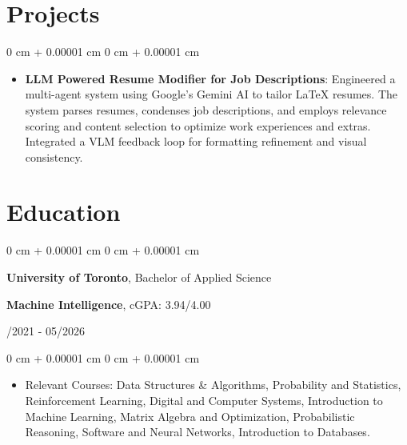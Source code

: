 \documentclass[10pt, letterpaper]{article}
\newenvironment{highlights}{
    \begin{itemize}[
        topsep=0.10 cm,
        parsep=0.10 cm,
        partopsep=0pt,
        itemsep=0pt,
        leftmargin=0 cm + 10pt
    ]
}{
    \end{itemize}
}
\newenvironment{onecolentry}{
    \begin{adjustwidth}{
        0 cm + 0.00001 cm
    }{
        0 cm + 0.00001 cm
    }
}{
    \end{adjustwidth}
}
\newenvironment{twocolentry}[2][]{
    \onecolentry
    \def\secondColumn{#2}
    \setcolumnwidth{\fill, 4.5 cm}
    \begin{paracol}{2}
}{
    \switchcolumn \raggedleft \secondColumn
    \end{paracol}
    \endonecolentry
}
\begin{document}
\section{Projects}
\vspace{0.10 cm}
\begin{onecolentry}
    \begin{highlights}
        \item \textbf{LLM Powered Resume Modifier for Job Descriptions}: Engineered a multi-agent system using Google's Gemini AI to tailor LaTeX resumes. The system parses resumes, condenses job descriptions, and employs relevance scoring and content selection to optimize work experiences and extras. Integrated a VLM feedback loop for formatting refinement and visual consistency.
    \end{highlights}
\end{onecolentry}

\section{Education}
\vspace{0.08 cm}
\begin{twocolentry}{09/2021 - 05/2026}
    {\textbf{University of Toronto}}, Bachelor of Applied Science  
    \item \textbf{Machine Intelligence}, cGPA: {3.94}/4.00
\end{twocolentry}
\vspace{0.10 cm}
\begin{onecolentry}
    \begin{highlights}
        \item Relevant Courses: Data Structures \& Algorithms, Probability and Statistics, Reinforcement Learning, Digital and Computer Systems, Introduction to Machine Learning, Matrix Algebra and Optimization, Probabilistic Reasoning, Software and Neural Networks, Introduction to Databases.
    \end{highlights}
\end{onecolentry}
\end{document}
